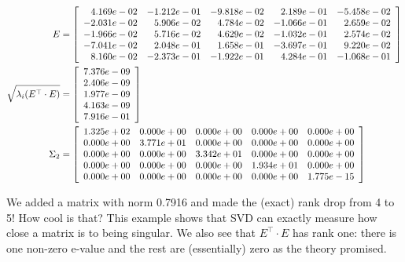 \begin{align*}
E&=\left[
\begin{array}{rrrrr}
4.169e-02 & -1.212e-01 & -9.818e-02 & 2.189e-01 & -5.458e-02 \\
-2.031e-02 & 5.906e-02 & 4.784e-02 & -1.066e-01 & 2.659e-02 \\
-1.966e-02 & 5.716e-02 & 4.629e-02 & -1.032e-01 & 2.574e-02 \\
-7.041e-02 & 2.048e-01 & 1.658e-01 & -3.697e-01 & 9.220e-02 \\
8.160e-02 & -2.373e-01 & -1.922e-01 & 4.284e-01 & -1.068e-01 \\
\end{array}
\right] \bigskip \\
\sqrt{\lambda_i(E^\top \cdot E)} &=\left[
\begin{array}{c}
7.376e-09 \\
2.406e-09 \\
1.977e-09 \\
4.163e-09 \\
7.916e-01 \\
\end{array}
\right] \bigskip\\
\Sigma_2&= \left[
\begin{array}{rrrrr}
1.325e+02 & 0.000e+00 & 0.000e+00 & 0.000e+00 & 0.000e+00 \\
0.000e+00 & 3.771e+01 & 0.000e+00 & 0.000e+00 & 0.000e+00 \\
0.000e+00 & 0.000e+00 & 3.342e+01 & 0.000e+00 & 0.000e+00 \\
0.000e+00 & 0.000e+00 & 0.000e+00 & 1.934e+01 & 0.000e+00 \\
0.000e+00 & 0.000e+00 & 0.000e+00 & 0.000e+00 & 1.775e-15 \\
\end{array}
\right]
\end{align*}

\vspace*{0.2cm}
We added a matrix with norm 0.7916 and made the (exact)  rank drop from 4 to 5! How cool is that? This example shows that SVD can exactly measure how close a matrix is to being singular. We also see that $E^\top \cdot E$ has rank one: there is one non-zero e-value and the rest are (essentially) zero as the theory promised.

\vspace*{.2cm} 

